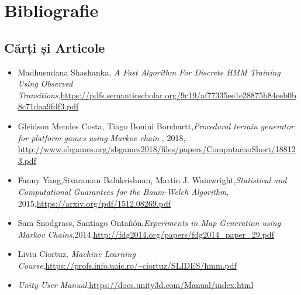 \chapter*{Bibliografie} 
\section{Cărți și Articole}
\begin{itemize}
    \item{Madhusudana Shashanka, \textit{A Fast Algorithm For Discrete HMM Training Using Observed Transitions},\newline \url{https://pdfs.semanticscholar.org/9c19/af77335ee1e28875b84eeb0b8c71daa9fdf3.pdf}}
    \item{Gleidson Mendes Costa, Tiago Bonini Borchartt,\newline \textit{Procedural terrain generator for platform games using Markov chain
}, 2018,  \url{http://www.sbgames.org/sbgames2018/files/papers/ComputacaoShort/188123.pdf}}
	\item{Fanny Yang,Sivaraman Balakrishnan, Martin J. Wainwright,\newline \textit{Statistical and Computational Guarantees for the
Baum-Welch Algorithm}, 2015,\newline \url{https://arxiv.org/pdf/1512.08269.pdf}}
	\item{Sam Snodgrass, Santiago Ontañón,\newline \textit{Experiments in Map Generation using Markov Chains},2014,\newline \url{http://fdg2014.org/papers/fdg2014_paper_29.pdf}}
	\item {Liviu Ciortuz, \textit{Machine Learning Course},\newline \url{https://profs.info.uaic.ro/~ciortuz/SLIDES/hmm.pdf}}
	\item{\textit{Unity User Manual},\newline \url{https://docs.unity3d.com/Manual/index.html}}
\end{itemize}

